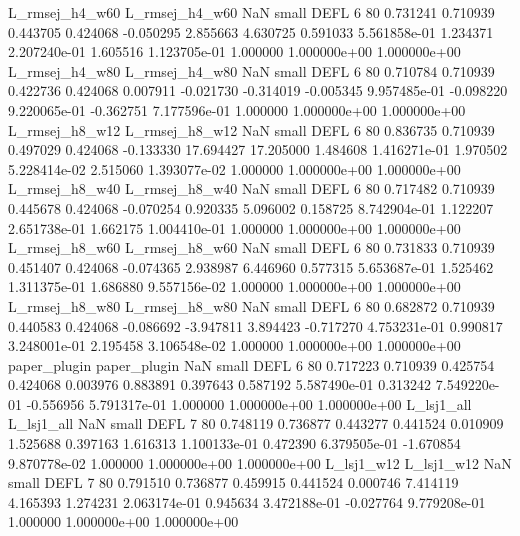 L_rmsej_h4_w60 L_rmsej_h4_w60                   NaN      small     DEFL                 6 80 0.731241       0.710939 0.443705       0.424068   -0.050295      2.855663      4.630725     0.591033   5.561858e-01  1.234371 2.207240e-01     1.605516   1.123705e-01            1.000000    1.000000e+00        1.000000e+00
L_rmsej_h4_w80 L_rmsej_h4_w80                   NaN      small     DEFL                 6 80 0.710784       0.710939 0.422736       0.424068    0.007911     -0.021730     -0.314019    -0.005345   9.957485e-01 -0.098220 9.220065e-01    -0.362751   7.177596e-01            1.000000    1.000000e+00        1.000000e+00
L_rmsej_h8_w12 L_rmsej_h8_w12                   NaN      small     DEFL                 6 80 0.836735       0.710939 0.497029       0.424068   -0.133330     17.694427     17.205000     1.484608   1.416271e-01  1.970502 5.228414e-02     2.515060   1.393077e-02            1.000000    1.000000e+00        1.000000e+00
L_rmsej_h8_w40 L_rmsej_h8_w40                   NaN      small     DEFL                 6 80 0.717482       0.710939 0.445678       0.424068   -0.070254      0.920335      5.096002     0.158725   8.742904e-01  1.122207 2.651738e-01     1.662175   1.004410e-01            1.000000    1.000000e+00        1.000000e+00
L_rmsej_h8_w60 L_rmsej_h8_w60                   NaN      small     DEFL                 6 80 0.731833       0.710939 0.451407       0.424068   -0.074365      2.938987      6.446960     0.577315   5.653687e-01  1.525462 1.311375e-01     1.686880   9.557156e-02            1.000000    1.000000e+00        1.000000e+00
L_rmsej_h8_w80 L_rmsej_h8_w80                   NaN      small     DEFL                 6 80 0.682872       0.710939 0.440583       0.424068   -0.086692     -3.947811      3.894423    -0.717270   4.753231e-01  0.990817 3.248001e-01     2.195458   3.106548e-02            1.000000    1.000000e+00        1.000000e+00
  paper_plugin   paper_plugin                   NaN      small     DEFL                 6 80 0.717223       0.710939 0.425754       0.424068    0.003976      0.883891      0.397643     0.587192   5.587490e-01  0.313242 7.549220e-01    -0.556956   5.791317e-01            1.000000    1.000000e+00        1.000000e+00
    L_lsj1_all     L_lsj1_all                   NaN      small     DEFL                 7 80 0.748119       0.736877 0.443277       0.441524    0.010909      1.525688      0.397163     1.616313   1.100133e-01  0.472390 6.379505e-01    -1.670854   9.870778e-02            1.000000    1.000000e+00        1.000000e+00
    L_lsj1_w12     L_lsj1_w12                   NaN      small     DEFL                 7 80 0.791510       0.736877 0.459915       0.441524    0.000746      7.414119      4.165393     1.274231   2.063174e-01  0.945634 3.472188e-01    -0.027764   9.779208e-01            1.000000    1.000000e+00        1.000000e+00
